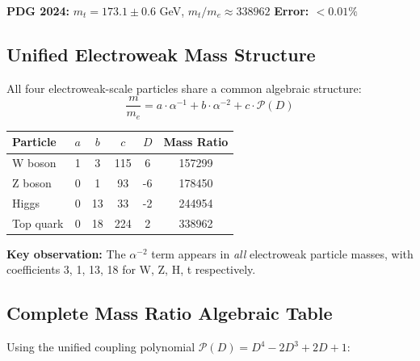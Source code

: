 \documentclass[11pt,a4paper]{article}
\begin{document}
\textbf{PDG 2024:} $m_t = 173.1 \pm 0.6$ GeV, $m_t/m_e \approx 338962$ \quad \textbf{Error: $< 0.01\%$}

\subsection{Unified Electroweak Mass Structure}

All four electroweak-scale particles share a common algebraic structure:
\[
\frac{m}{m_e} = a \cdot \alpha^{-1} + b \cdot \alpha^{-2} + c \cdot \mathcal{P}(D)
\]

\begin{center}
\begin{tabular}{|l|c|c|c|c|c|}
\hline
\textbf{Particle} & $a$ & $b$ & $c$ & $D$ & \textbf{Mass Ratio} \\
\hline
W boson & 1 & 3 & 115 & 6 & 157299 \\
Z boson & 0 & 1 & 93 & -6 & 178450 \\
Higgs & 0 & 13 & 33 & -2 & 244954 \\
Top quark & 0 & 18 & 224 & 2 & 338962 \\
\hline
\end{tabular}
\end{center}

\textbf{Key observation:} The $\alpha^{-2}$ term appears in \textit{all} electroweak particle masses, with coefficients 3, 1, 13, 18 for W, Z, H, t respectively.

\subsection{Complete Mass Ratio Algebraic Table}

Using the unified coupling polynomial $\mathcal{P}(D) = D^4 - 2D^3 + 2D + 1$:
\end{document}
